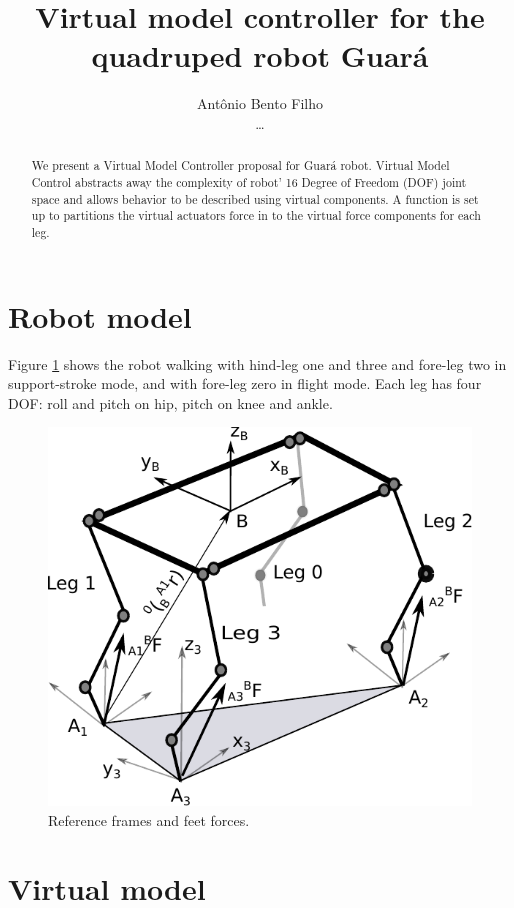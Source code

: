 \documentclass[]{article}
\title{Virtual model controller for the quadruped robot Guar\'a}
\author{Antônio Bento Filho\\\dots}
\begin{document}
\maketitle

\begin{abstract}
We present a Virtual Model Controller \cite{pratt_virtual_1996} proposal for Guará robot. Virtual Model Control abstracts away the complexity of robot' 16 Degree of Freedom (DOF) joint space and allows behavior to be described using virtual components. A function is set up to partitions the virtual actuators force in to the virtual force components for each leg.
\end{abstract}
\section{Robot model}
Figure \ref{fig:guarawolflegs} shows the robot walking with hind-leg one and three  and fore-leg two in support-stroke mode, and with fore-leg zero in flight mode. Each leg has four DOF: roll and pitch on hip, pitch on knee and ankle. 	
\begin{figure}%
	\centering
	\includegraphics[scale=0.5]{"Figuras/GuaraWolfLegs"}
	\caption{Reference frames and feet forces.}
	\label{fig:guarawolflegs}
\end{figure}
\section{Virtual model}%
\end{document}
